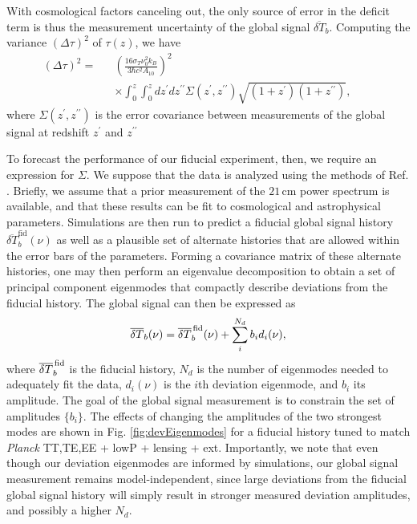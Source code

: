 \documentclass[twocolumn,aps,prd,nofootinbib,showpacs,superscriptaddress]{revtex4-1}
\begin{document}
With cosmological factors canceling out, the only source of error in the deficit term is thus the measurement uncertainty of the global signal $\overline{\delta T}_b$. Computing the variance $(\Delta \tau)^2$ of $\tau(z)$, we have
\begin{eqnarray}
\label{eq:DeltaTauDoubleIntegral}
(\Delta \tau)^2 = &&\left( \frac{16 \sigma_T \nu_0^2 k_B}{3 \hbar c^2 A_{10}} \right)^2 \nonumber \\
&&\times \int_0^z \! \!\int_0^z dz^\prime dz^{\prime \prime} \Sigma (z^\prime, z^{\prime \prime}) \sqrt{(1+z^\prime) (1+z^{\prime \prime})}, \qquad
\end{eqnarray}
where $\Sigma (z^\prime, z^{\prime \prime})$ is the error covariance between measurements of 
the global signal at redshift $z^\prime$ and $z^{\prime \prime}$

To forecast the performance of our fiducial experiment, then, we require an expression for $\Sigma$. We suppose that the data is analyzed using the methods of Ref. \cite{Liu_in_prep}. Briefly, we assume that a prior measurement of the $21\,\textrm{cm}$ power spectrum is available, and that these results can be fit to cosmological and astrophysical parameters. Simulations are then run to predict a fiducial global signal history $\overline{\delta T}_b^\textrm{fid} (\nu)$ as well as a plausible set of alternate histories that are allowed within the error bars of the parameters. Forming a covariance matrix of these alternate histories, one may then perform an eigenvalue decomposition to obtain a set of principal component eigenmodes that compactly describe deviations from the fiducial history. The global signal can then be expressed as
\begin{equation}
\overline{\delta T}_b (\nu) = \overline{\delta T}_b^\textrm{\,fid} (\nu) + \sum_i^{N_d} b_i d_i (\nu),
\end{equation}
where $\overline{\delta T}_b^\textrm{\,fid}$ is the fiducial history, $N_d$ is the number of eigenmodes needed to adequately fit the data, $d_i (\nu)$ is the $i$th deviation eigenmode, and $b_i$ its amplitude. The goal of the global signal measurement is to constrain the set of amplitudes $\{ b_i \}$. The effects of changing the amplitudes of the two strongest modes are shown in Fig. \ref{fig:devEigenmodes} for a fiducial history tuned to match \emph{Planck} TT,TE,EE + lowP + lensing + ext. Importantly, we note that even though our deviation eigenmodes are informed by simulations, our global signal measurement remains model-independent, since large deviations from the fiducial global signal history will simply result in stronger measured deviation amplitudes, and possibly a higher $N_d$.
\end{document}
